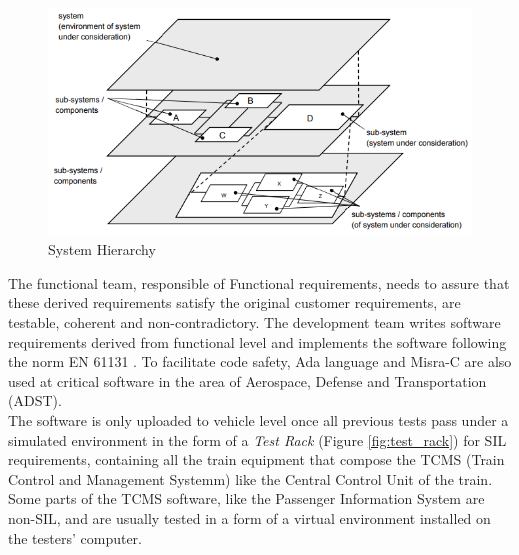 \begin{figure}[h]
    \centering
    \includegraphics[width=\textwidth]{images/subsystem_reqs.PNG}
    \caption{System Hierarchy}
    \label{fig:system_hierarchy}
\end{figure}


The functional team, responsible of Functional requirements, needs to assure that these derived requirements satisfy the original customer requirements, are testable, coherent and non-contradictory. The development team writes software requirements derived from functional level and implements the software following the norm EN 61131 \cite{en61131}. To facilitate code safety, Ada language \cite{ada_book} and Misra-C \cite{misra_c} are also used at critical software in the area of Aerospace, Defense and Transportation (ADST).\\

The software is only uploaded to vehicle level once all previous tests pass under a simulated environment in the form of a \textit{Test Rack} (Figure \ref{fig:test_rack}) for SIL requirements, containing all the train equipment that compose the TCMS (Train Control and Management Systemm) like the Central Control Unit of the train. Some parts of the TCMS software, like the Passenger Information System are non-SIL, and are usually tested in a form of a virtual environment installed on the testers' computer. \\

